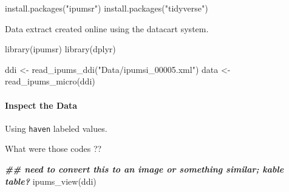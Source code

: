 \documentclass[
]{book}
\newenvironment{Shaded}{\begin{snugshade}}{\end{snugshade}}
\newcommand{\DecValTok}[1]{\textcolor[rgb]{0.00,0.00,0.81}{#1}}
\newcommand{\DocumentationTok}[1]{\textcolor[rgb]{0.56,0.35,0.01}{\textbf{\textit{#1}}}}
\newcommand{\FunctionTok}[1]{\textcolor[rgb]{0.00,0.00,0.00}{#1}}
\newcommand{\NormalTok}[1]{#1}
\newcommand{\OtherTok}[1]{\textcolor[rgb]{0.56,0.35,0.01}{#1}}
\newcommand{\SpecialCharTok}[1]{\textcolor[rgb]{0.00,0.00,0.00}{#1}}
\newcommand{\StringTok}[1]{\textcolor[rgb]{0.31,0.60,0.02}{#1}}
\begin{document}
\begin{Shaded}
\begin{Highlighting}[]
\FunctionTok{install.packages}\NormalTok{(}\StringTok{"ipumsr"}\NormalTok{)}
\FunctionTok{install.packages}\NormalTok{(}\StringTok{"tidyverse"}\NormalTok{)}
\end{Highlighting}
\end{Shaded}

Data extract created online using the datacart system.

\begin{Shaded}
\begin{Highlighting}[]
\FunctionTok{library}\NormalTok{(ipumsr)}
\FunctionTok{library}\NormalTok{(dplyr)}


\NormalTok{ddi }\OtherTok{\textless{}{-}} \FunctionTok{read\_ipums\_ddi}\NormalTok{(}\StringTok{"Data/ipumsi\_00005.xml"}\NormalTok{)}
\NormalTok{data }\OtherTok{\textless{}{-}} \FunctionTok{read\_ipums\_micro}\NormalTok{(ddi)}
\end{Highlighting}
\end{Shaded}

\hypertarget{inspect-the-data-1}{%
\paragraph*{Inspect the Data}\label{inspect-the-data-1}}

Using \texttt{haven} labeled values.

\begin{Shaded}
\end{Shaded}

What were those codes ??

\begin{Shaded}
\begin{Highlighting}[]
\DocumentationTok{\#\# need to convert this to an image or something similar; kable table?}
\FunctionTok{ipums\_view}\NormalTok{(ddi)}
\end{Highlighting}
\end{Shaded}
\end{document}
